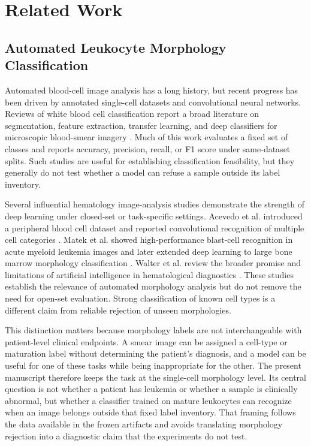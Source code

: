 \section{Related Work}

\subsection{Automated Leukocyte Morphology Classification}

Automated blood-cell image analysis has a long history, but recent progress has been driven by annotated single-cell datasets and convolutional neural networks. Reviews of white blood cell classification report a broad literature on segmentation, feature extraction, transfer learning, and deep classifiers for microscopic blood-smear imagery \cite{khan2021_wbc_review,deshpande2021_blood_cells_review}. Much of this work evaluates a fixed set of classes and reports accuracy, precision, recall, or F1 score under same-dataset splits. Such studies are useful for establishing classification feasibility, but they generally do not test whether a model can refuse a sample outside its label inventory.

Several influential hematology image-analysis studies demonstrate the strength of deep learning under closed-set or task-specific settings. Acevedo et al. introduced a peripheral blood cell dataset and reported convolutional recognition of multiple cell categories \cite{acevedo2019_peripheral_blood_cnn}. Matek et al. showed high-performance blast-cell recognition in acute myeloid leukemia images and later extended deep learning to large bone marrow morphology classification \cite{matek2019_blast,matek2021_bone_marrow}. Walter et al. review the broader promise and limitations of artificial intelligence in hematological diagnostics \cite{walter2023_ai_hematology}. These studies establish the relevance of automated morphology analysis but do not remove the need for open-set evaluation. Strong classification of known cell types is a different claim from reliable rejection of unseen morphologies.

This distinction matters because morphology labels are not interchangeable with patient-level clinical endpoints. A smear image can be assigned a cell-type or maturation label without determining the patient's diagnosis, and a model can be useful for one of these tasks while being inappropriate for the other. The present manuscript therefore keeps the task at the single-cell morphology level. Its central question is not whether a patient has leukemia or whether a sample is clinically abnormal, but whether a classifier trained on mature leukocytes can recognize when an image belongs outside that fixed label inventory. That framing follows the data available in the frozen artifacts and avoids translating morphology rejection into a diagnostic claim that the experiments do not test.

